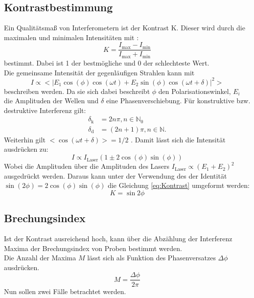 \subsection{Kontrastbestimmung}
Ein Qualitätsmaß von Interferometern ist der Kontrast K. Dieser wird durch die maximalen
und minimalen Intensitäten mit :
\begin{equation}
	K= \frac{I_{\text{max}}-I_{\text{min}}}{I_{\text{max}}+I_{\text{min}}}
	\label{eq:Kontrast}
\end{equation}
bestimmt. Dabei ist 1 der bestmögliche und 0 der schlechteste Wert. \\
Die gemeinsame Intensität der gegenläufigen Strahlen kann mit
\begin{equation}
	I \propto <|E_1 \cos{(\phi)}\cos{(\omega t)} + E_2 \sin{(\phi)}\cos{(\omega t + \delta)} |^2>
\end{equation}
beschreiben werden. Da sie sich dabei beschreibt $\phi$ den Polarisationswinkel, $E_i$ die
Amplituden der Wellen und $\delta$ eine Phasenverschiebung.
Für konstruktive bzw. destruktive Interferenz gilt:
\begin{align*}
	\delta_{\text{k}}&=2 n \pi , n \in \mathds{N}_0 \\
	\delta_{\text{d}}&=(2n+1)\pi , n \in \mathds{N} .
\end{align*}
Weiterhin gilt $<\cos(\omega t + \delta)>=1/2$ .
Damit lässt sich die Intensität ausdrücken zu:
\begin{equation}
	I \propto I_{\text{Laser}}\left(1\pm 2\cos{(\phi)}\sin{(\phi)}\right)
\end{equation}
Wobei die Amplituden über die Amplituden des Lasers $I_{\text{Laser}}\propto (E_1+E_2)^2$
ausgedrückt werden.
Daraus kann unter der Verwendung des der Identität $\sin{(2\phi)}=2\cos{(\phi)}\sin{(\phi)}$
die Gleichung \ref{eq:Kontrast} umgeformt werden:
\begin{equation}
	K=\sin{2\phi}
	\label{eq:Kontrast2}
\end{equation}
\subsection{Brechungsindex}
Ist der Kontrast ausreichend hoch, kann über die Abzählung der Interferenz Maxima der
Brechungsindex von Proben bestimmt werden.\\
Die Anzahl der Maxima $M$ lässt sich als Funktion des Phasenversatzes $\Delta \phi$ ausdrücken.
\begin{equation}
	M=\frac{\Delta \phi}{2\pi}
\label{eq:dp}
\end{equation}
Nun sollen zwei Fälle betrachtet werden.
